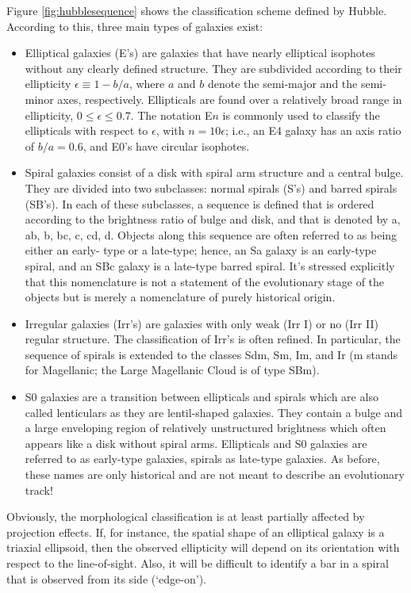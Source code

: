 \documentclass[a4paper,11pt]{article}
\begin{document}
{\noindent}Figure \ref{fig:hubblesequence} shows the classification scheme defined by Hubble. According to this, three main types of galaxies exist:

\begin{itemize}
    \item Elliptical galaxies (E's) are galaxies that have nearly elliptical isophotes without any clearly defined structure. They are subdivided according to their ellipticity $\epsilon\equiv1-b/a$, where $a$ and $b$ denote the semi-major and the semi-minor axes, respectively. Ellipticals are found over a relatively broad range in ellipticity, $0\leq\epsilon\leq0.7$. The notation E$n$ is commonly used to classify the ellipticals with respect to $\epsilon$, with $n=10\epsilon$; i.e., an E4 galaxy has an axis ratio of $b/a=0.6$, and E0's have circular isophotes.
    \item Spiral galaxies consist of a disk with spiral arm structure and a central bulge. They are divided into two subclasses: normal spirals (S's) and barred spirals (SB's). In each of these subclasses, a sequence is defined that is ordered according to the brightness ratio of bulge and disk, and that is denoted by a, ab, b, bc, c, cd, d. Objects along this sequence are often referred to as being either an early- type or a late-type; hence, an Sa galaxy is an early-type spiral, and an SBc galaxy is a late-type barred spiral. It's stressed explicitly that this nomenclature is not a statement of the evolutionary stage of the objects but is merely a nomenclature of purely historical origin.
    \item Irregular galaxies (Irr's) are galaxies with only weak (Irr I) or no (Irr II) regular structure. The classification of Irr's is often refined. In particular, the sequence of spirals is extended to the classes Sdm, Sm, Im, and Ir (m stands for Magellanic; the Large Magellanic Cloud is of type SBm).
    \item S0 galaxies are a transition between ellipticals and spirals which are also called lenticulars as they are lentil-shaped galaxies. They contain a bulge and a large enveloping region of relatively unstructured brightness which often appears like a disk without spiral arms. Ellipticals and S0 galaxies are referred to as early-type galaxies, spirals as late-type galaxies. As before, these names are only historical and are not meant to describe an evolutionary track!
\end{itemize}

{\noindent}Obviously, the morphological classification is at least partially affected by projection effects. If, for instance, the spatial shape of an elliptical galaxy is a triaxial ellipsoid, then the observed ellipticity will depend on its orientation with respect to the line-of-sight. Also, it will be difficult to identify a bar in a spiral that is observed from its side (`edge-on').
\end{document}
